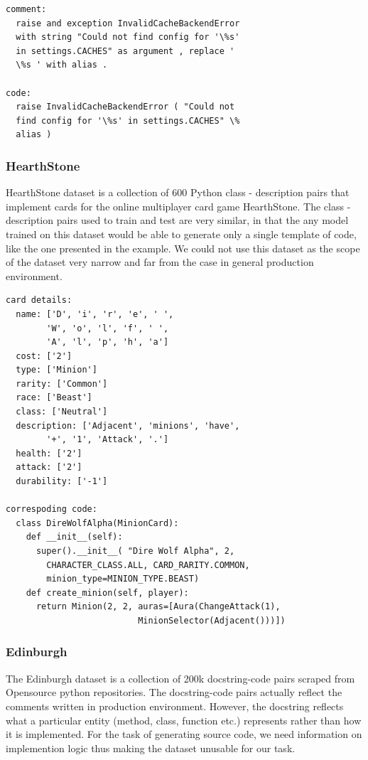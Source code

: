 \documentclass{IEEEtran}
\begin{document}
        \begin{lstlisting}[frame=single,basicstyle=\small]
comment:
  raise and exception InvalidCacheBackendError 
  with string "Could not find config for '\%s' 
  in settings.CACHES" as argument , replace ' 
  \%s ' with alias .

code:
  raise InvalidCacheBackendError ( "Could not 
  find config for '\%s' in settings.CACHES" \% 
  alias )
        \end{lstlisting}

        \subsubsection{HearthStone}
        HearthStone dataset is a collection of 600 Python class - description pairs
        that implement cards for the online multiplayer card game HearthStone.
        The class - description pairs used to train and test are very similar, in that
        the any model trained on this dataset would be able to generate only a
        single template of code, like the one presented in the example. We could not
        use this dataset as the scope of the dataset very narrow and far from the case
        in general production environment. 

        \begin{lstlisting}[frame=single,basicstyle=\scriptsize]
card details:
  name: ['D', 'i', 'r', 'e', ' ', 
        'W', 'o', 'l', 'f', ' ', 
        'A', 'l', 'p', 'h', 'a']
  cost: ['2']
  type: ['Minion']
  rarity: ['Common']
  race: ['Beast']
  class: ['Neutral']
  description: ['Adjacent', 'minions', 'have', 
        '+', '1', 'Attack', '.']
  health: ['2']
  attack: ['2']
  durability: ['-1']

correspoding code:
  class DireWolfAlpha(MinionCard):
    def __init__(self):
      super().__init__( "Dire Wolf Alpha", 2, 
        CHARACTER_CLASS.ALL, CARD_RARITY.COMMON, 
        minion_type=MINION_TYPE.BEAST)
    def create_minion(self, player):
      return Minion(2, 2, auras=[Aura(ChangeAttack(1), 
                          MinionSelector(Adjacent()))])
        \end{lstlisting}

        \subsubsection{Edinburgh}
        The Edinburgh dataset is a collection of 200k docstring-code pairs scraped
        from Opensource python repositories. The docstring-code pairs actually
        reflect the comments written in production environment. However, the docstring
        reflects what a particular entity (method, class, function etc.) represents
        rather than how it is implemented. For the task of generating source code,
        we need information on implemention logic thus making the dataset unusable
        for our task.
\end{document}

